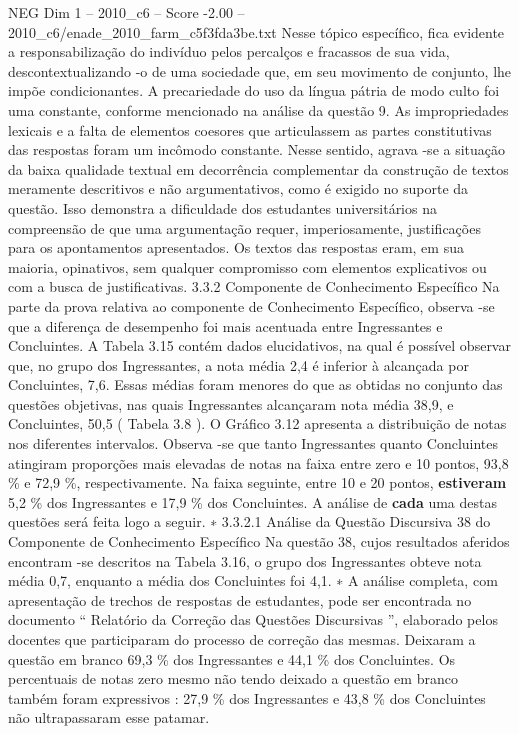 \begin{textsample}{NEG Dim 1 – 2010\_c6 – Score -2.00 – 2010\_c6/enade\_2010\_farm\_c5f3fda3be.txt}
Nesse tópico específico, fica evidente a responsabilização do indivíduo pelos percalços e fracassos de sua vida, descontextualizando -o de uma sociedade que, em seu movimento de conjunto, lhe impõe condicionantes.
A precariedade do uso da língua pátria de modo culto foi uma constante, conforme mencionado na análise da questão 9.
As impropriedades lexicais e a falta de elementos coesores que articulassem as partes constitutivas das respostas foram um incômodo constante.
Nesse sentido, agrava -se a situação da baixa qualidade textual em decorrência complementar da construção de textos meramente descritivos e não argumentativos, como é exigido no suporte da questão.
Isso demonstra a dificuldade dos estudantes universitários na compreensão de que uma argumentação requer, imperiosamente, justificações para os apontamentos apresentados.
Os textos das respostas eram, em sua maioria, opinativos, sem qualquer compromisso com elementos explicativos ou com a busca de justificativas. 3.3.2 Componente de Conhecimento Específico Na parte da prova relativa ao componente de Conhecimento Específico, observa -se que a diferença de desempenho foi mais acentuada entre Ingressantes e Concluintes.
A Tabela 3.15 contém dados elucidativos, na qual é possível observar que, no grupo dos Ingressantes, a nota média 2,4 é inferior à alcançada por Concluintes, 7,6.
Essas médias foram menores do que as obtidas no conjunto das questões objetivas, nas quais Ingressantes alcançaram nota média 38,9, e Concluintes, 50,5 ( Tabela 3.8 ).
O Gráfico 3.12 apresenta a distribuição de notas nos diferentes intervalos.
Observa -se que tanto Ingressantes quanto Concluintes atingiram proporções mais elevadas de notas na faixa entre zero e 10 pontos, 93,8 \% e 72,9 \%, respectivamente.
Na faixa seguinte, entre 10 e 20 pontos, \textbf{estiveram} 5,2 \% dos Ingressantes e 17,9 \% dos Concluintes.
A análise de \textbf{cada} uma destas questões será feita logo a seguir. ∗ 3.3.2.1 Análise da Questão Discursiva 38 do Componente de Conhecimento Específico Na questão 38, cujos resultados aferidos encontram -se descritos na Tabela 3.16, o grupo dos Ingressantes obteve nota média 0,7, enquanto a média dos Concluintes foi 4,1. ∗ A análise completa, com apresentação de trechos de respostas de estudantes, pode ser encontrada no documento “ Relatório da Correção das Questões Discursivas ”, elaborado pelos docentes que participaram do processo de correção das mesmas.
Deixaram a questão em branco 69,3 \% dos Ingressantes e 44,1 \% dos Concluintes.
Os percentuais de notas zero mesmo não tendo deixado a questão em branco também foram expressivos : 27,9 \% dos Ingressantes e 43,8 \% dos Concluintes não ultrapassaram esse patamar.

\end{textsample}

